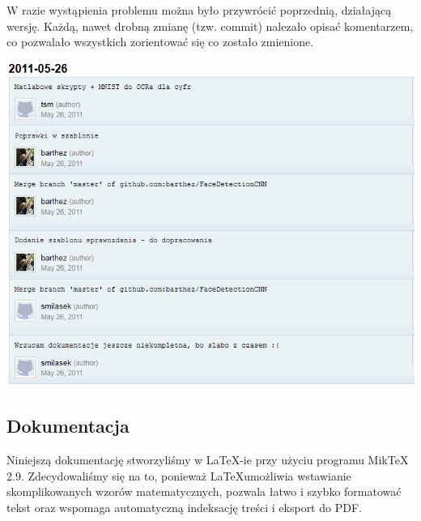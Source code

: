 \documentclass[11pt,a4paper]{article}
\begin{document}
W razie wystąpienia problemu można było przywrócić poprzednią, działającą wersję. Każdą, nawet 
drobną zmianę (tzw. commit) nalezało opisać komentarzem, co pozwalało wszystkich zorientować się 
co zostało zmienione.

\vspace*{0.5cm}
\begin{center}
\includegraphics[scale=0.6]{commits}
\end{center}
\vspace*{0.5cm}

\subsection{Dokumentacja}

Niniejszą dokumentację stworzyliśmy w \LaTeX-ie przy użyciu programu MikTeX 2.9. Zdecydowaliśmy się na 
to, ponieważ \LaTeX umożliwia wstawianie skomplikowanych wzorów matematycznych, pozwala łatwo i 
szybko formatować tekst oraz wspomaga automatyczną indeksację treści i eksport do PDF. 


\end{document}
